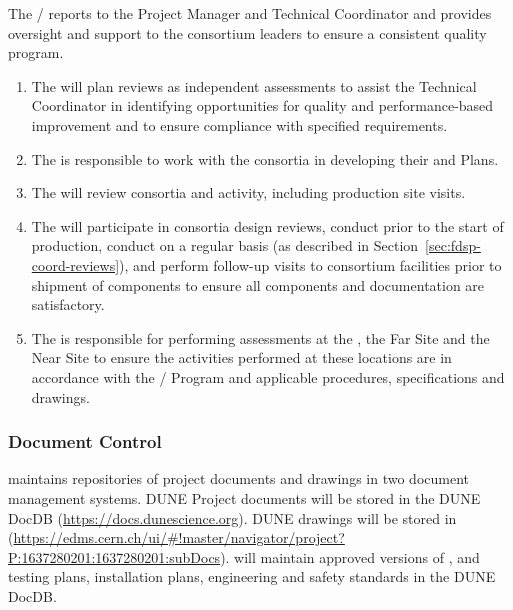 The /  reports
to the  Project Manager and  Technical
Coordinator and provides oversight and support to the consortium
leaders to ensure a consistent quality program.
\begin{enumerate}
  \item The  will plan reviews as independent assessments to assist
    the Technical Coordinator in identifying opportunities for
    quality and performance-based improvement and to ensure compliance
    with specified requirements.
  \item The  is responsible to work with the consortia in
    developing their  and  Plans.
  \item The  will review consortia  and  activity, including
    production site visits.
  \item The  will participate in consortia design reviews, conduct
     prior to the start of production,
    conduct  on a regular basis (as
    described in Section~\ref{sec:fdsp-coord-reviews}), and perform
    follow-up visits to consortium facilities prior to shipment of
    components to ensure all components and documentation are
    satisfactory.
\item The  is responsible for performing assessments at the
  , the Far Site and the Near Site to
  ensure the activities performed at these locations are in accordance
  with the /  Program and applicable procedures,
  specifications and drawings.
\end{enumerate}

\subsubsection{Document Control}
\label{sec:fdsp-coord-document}

 maintains repositories of project documents and drawings in two
document management systems.  DUNE Project documents will be stored in
the DUNE DocDB (\url{https://docs.dunescience.org}). DUNE drawings
will be stored in 
(\url{https://edms.cern.ch/ui/#!master/navigator/project?P:1637280201:1637280201:subDocs}).
 will maintain approved versions of ,  and testing plans,
installation plans, engineering and safety standards in the DUNE
DocDB.

